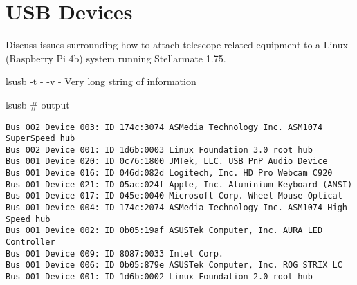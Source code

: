 \section{USB Devices}

Discuss issues surrounding how to attach telescope related equipment to a Linux
(Raspberry Pi 4b) system running Stellarmate 1.75.

lsusb
       -t  -  
       -v  - Very long string of information


lsusb # output
\begingroup \fontsize{10pt}{10pt}
\selectfont
\begin{verbatim} 
Bus 002 Device 003: ID 174c:3074 ASMedia Technology Inc. ASM1074 SuperSpeed hub
Bus 002 Device 001: ID 1d6b:0003 Linux Foundation 3.0 root hub
Bus 001 Device 020: ID 0c76:1800 JMTek, LLC. USB PnP Audio Device
Bus 001 Device 016: ID 046d:082d Logitech, Inc. HD Pro Webcam C920
Bus 001 Device 021: ID 05ac:024f Apple, Inc. Aluminium Keyboard (ANSI)
Bus 001 Device 017: ID 045e:0040 Microsoft Corp. Wheel Mouse Optical
Bus 001 Device 004: ID 174c:2074 ASMedia Technology Inc. ASM1074 High-Speed hub
Bus 001 Device 002: ID 0b05:19af ASUSTek Computer, Inc. AURA LED Controller
Bus 001 Device 009: ID 8087:0033 Intel Corp. 
Bus 001 Device 006: ID 0b05:879e ASUSTek Computer, Inc. ROG STRIX LC
Bus 001 Device 001: ID 1d6b:0002 Linux Foundation 2.0 root hub
\end{verbatim}
\endgroup

